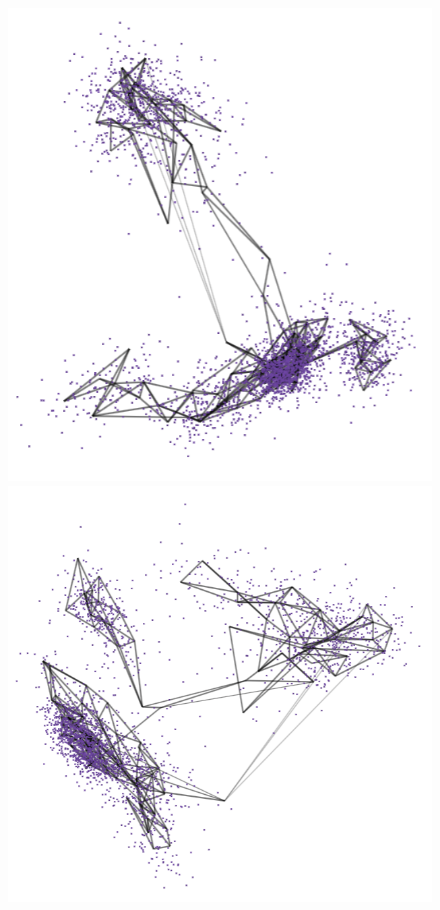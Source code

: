 \documentclass[
  12pt]{article}
\begin{document}
\begin{figure}[H]
%
\begin{minipage}{0.25\linewidth}
\includegraphics{figures/pbmc3k/sc_5.png}\end{minipage}%
%
\begin{minipage}{0.25\linewidth}
\includegraphics{figures/pbmc3k/sc_6.png}\end{minipage}%


\end{figure}
\end{document}
